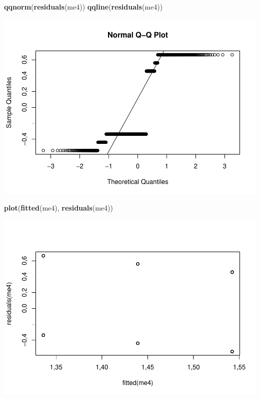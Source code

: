 \documentclass[]{article}
\newenvironment{Shaded}{\begin{snugshade}}{\end{snugshade}}
\newcommand{\KeywordTok}[1]{\textcolor[rgb]{0.13,0.29,0.53}{\textbf{#1}}}
\newcommand{\NormalTok}[1]{#1}
\begin{document}
\begin{Shaded}
\begin{Highlighting}[]
\KeywordTok{qqnorm}\NormalTok{(}\KeywordTok{residuals}\NormalTok{(me4))}
\KeywordTok{qqline}\NormalTok{(}\KeywordTok{residuals}\NormalTok{(me4))}
\end{Highlighting}
\end{Shaded}

\includegraphics{titanicDataClean_files/figure-latex/unnamed-chunk-25-7.pdf}

\begin{Shaded}
\begin{Highlighting}[]
\KeywordTok{plot}\NormalTok{(}\KeywordTok{fitted}\NormalTok{(me4), }\KeywordTok{residuals}\NormalTok{(me4))}
\end{Highlighting}
\end{Shaded}

\includegraphics{titanicDataClean_files/figure-latex/unnamed-chunk-25-8.pdf}
\end{document}
